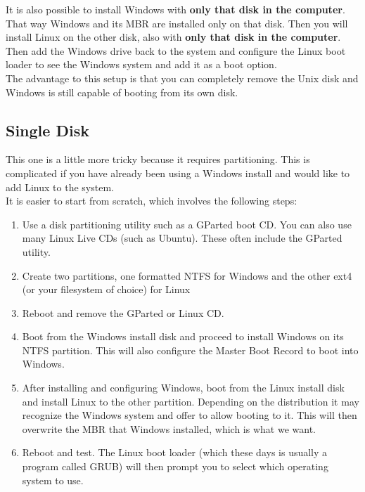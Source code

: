 It is also possible to install Windows with \textbf{only that disk in the computer}.  That way Windows and its MBR are installed only on that disk.  Then you will install Linux on the other disk, also with \textbf{only that disk in the computer}.  Then add the Windows drive back to the system and configure the Linux boot loader to see the Windows system and add it as a boot option.\\

The advantage to this setup is that you can completely remove the Unix disk and Windows is still capable of booting from its own disk.

\subsection{Single Disk}

This one is a little more tricky because it requires partitioning.  This is complicated if you have already been using a Windows install and would like to add Linux to the system.\\

It is easier to start from scratch, which involves the following steps:

\begin{enumerate}

\item
Use a disk partitioning utility such as a GParted boot CD.  You can also use many Linux Live CDs (such as Ubuntu).  These often include the GParted utility.

\item
Create two partitions, one formatted NTFS for Windows and the other ext4 (or your filesystem of choice) for Linux

\item
Reboot and remove the GParted or Linux CD.

\item
Boot from the Windows install disk and proceed to install Windows on its NTFS partition.  This will also configure the Master Boot Record to boot into Windows.

\item
After installing and configuring Windows, boot from the Linux install disk and install Linux to the other partition.  Depending on the distribution it may recognize the Windows system and offer to allow booting to it.  This will then overwrite the MBR that Windows installed, which is what we want.

\item
Reboot and test.  The Linux boot loader (which these days is usually a program called GRUB) will then prompt you to select which operating system to use.

\end{enumerate}

